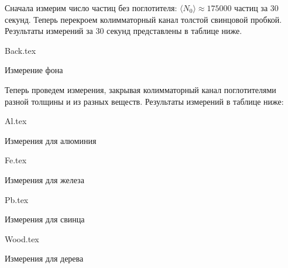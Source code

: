 Сначала измерим число частиц без поглотителя: $\langle N_0 \rangle \approx
175000$ частиц за $30$ секунд. Теперь перекроем колимматорный канал толстой
свинцовой пробкой. Результаты измерений за 30 секунд представлены в таблице
ниже.

\begin{table}[h!]
  \centering
  {Back.tex}
  \caption{Измерение фона}
\end{table}

Теперь проведем измерения, закрывая колимматорный канал поглотителями разной
толщины и из разных веществ. Результаты измерений в таблице ниже:

\begin{table}[h!]
  \centering
  {Al.tex}
  \caption{Измерения для алюминия}
\end{table}

\begin{table}
  \centering
  {Fe.tex}
  \caption{Измерения для железа}
\end{table}

\begin{table}
  \centering
  {Pb.tex}
  \caption{Измерения для свинца}
\end{table}

\begin{table}
  \centering
  {Wood.tex}
  \caption{Измерения для дерева}
\end{table}


